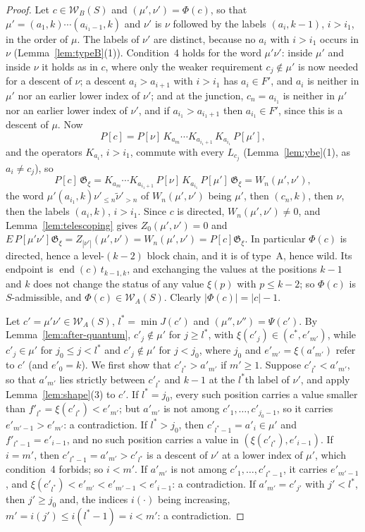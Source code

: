\documentclass[11pt]{article}
\newcommand{\G}{\mathfrak{G}}
\begin{document}
\begin{proof}
Let $c\in\mathcal W_B(S)$ and $(\mu',\nu')=\Phi(c)$, so that
$\mu'=(a_1,k)\cdots(a_{i_1-1},k)$ and $\nu'$ is $\nu$ followed by the
labels $(a_i,k-1)$, $i>i_1$, in the order of $\mu$. The labels of
$\nu'$ are distinct, because no $a_i$ with $i>i_1$ occurs in $\nu$
(Lemma~\ref{lem:typeB}(1)). Condition~4 holds for the word
$\mu'\nu'$: inside $\mu'$ and inside $\nu$ it holds as in $c$, where
only the weaker requirement $c_j\notin\mu'$ is now needed for a
descent of $\nu$; a descent $a_i>a_{i+1}$ with $i>i_1$ has
$a_i\in F'$, and $a_i$ is neither in $\mu'$ nor an earlier lower index
of $\nu'$; and at the junction, $c_n=a_{i_1}$ is neither in $\mu'$ nor
an earlier lower index of $\nu'$, and if $a_{i_1}>a_{i_1+1}$ then
$a_{i_1}\in F'$, since this is a descent of $\mu$. Now
\[
 P[c]=P[\nu]\,K_{a_m}\cdots K_{a_{i_1+1}}\,K_{a_{i_1}}\,P[\mu'],
\]
and the operators $K_{a_i}$, $i>i_1$, commute with every $L_{c_j}$
(Lemma~\ref{lem:ybe}(1), as $a_i\neq c_j$), so
\[
 P[c]\,\G_\xi=K_{a_m}\cdots K_{a_{i_1+1}}\,P[\nu]\,K_{a_{i_1}}\,P[\mu']\,\G_\xi
 =W_n(\mu',\nu') ,
\]
the word $\mu'(a_{i_1},k)\nu'_{\leq n}\tilde\nu'_{>n}$ of
$W_n(\mu',\nu')$ being $\mu'$, then $(c_n,k)$, then $\nu$, then the
labels $(a_i,k)$, $i>i_1$. Since $c$ is directed,
$W_n(\mu',\nu')\neq0$, and Lemma~\ref{lem:telescoping} gives
$Z_0(\mu',\nu')=0$ and
$E\,P[\mu'\nu']\G_\xi=Z_{|\nu'|}(\mu',\nu')=W_n(\mu',\nu')=P[c]\G_\xi$.
In particular $\Phi(c)$ is directed, hence a level-$(k-2)$ block
chain, and it is of type~A, hence wild. Its endpoint is
$\operatorname{end}(c)\,t_{k-1,k}$, and exchanging the values at the
positions $k-1$ and $k$ does not change the status of any value
$\xi(p)$ with $p\leq k-2$; so $\Phi(c)$ is $S$-admissible, and
$\Phi(c)\in\mathcal W_A(S)$. Clearly $|\Phi(c)|=|c|-1$.

Let $c'=\mu'\nu'\in\mathcal W_A(S)$, $l^\ast=\min J(c')$ and
$(\mu'',\nu'')=\Psi(c')$. By Lemma~\ref{lem:after-quantum},
$c'_j\notin\mu'$ for $j\geq l^\ast$, with
$\xi(c'_j)\in(c^\ast,e'_{m'})$, while $c'_j\in\mu'$ for
$j_0\leq j<l^\ast$ and $c'_j\notin\mu'$ for $j<j_0$, where $j_0$ and
$e'_{m'}=\xi(a'_{m'})$ refer to $c'$ (and $e'_0=k$). We first show that
$c'_{l^\ast}>a'_{m'}$ if $m'\geq1$. Suppose $c'_{l^\ast}<a'_{m'}$, so
that $a'_{m'}$ lies strictly between $c'_{l^\ast}$ and $k-1$ at the
$l^\ast$th label of $\nu'$, and apply Lemma~\ref{lem:shape}(3) to
$c'$. If $l^\ast=j_0$, every such position carries a value smaller than
$f'_{l^\ast}=\xi(c'_{l^\ast})<e'_{m'}$; but $a'_{m'}$ is not among
$c'_1,\ldots,c'_{j_0-1}$, so it carries $e'_{m'-1}>e'_{m'}$: a
contradiction. If $l^\ast>j_0$, then $c'_{l^\ast-1}=a'_i\in\mu'$ and
$f'_{l^\ast-1}=e'_{i-1}$, and no such position carries a value in
$(\xi(c'_{l^\ast}),e'_{i-1})$. If $i=m'$, then
$c'_{l^\ast-1}=a'_{m'}>c'_{l^\ast}$ is a descent of $\nu'$ at a lower
index of $\mu'$, which condition~4 forbids; so $i<m'$. If $a'_{m'}$ is
not among $c'_1,\ldots,c'_{l^\ast-1}$, it carries $e'_{m'-1}$, and
$\xi(c'_{l^\ast})<e'_{m'}<e'_{m'-1}<e'_{i-1}$: a contradiction. If
$a'_{m'}=c'_{j'}$ with $j'<l^\ast$, then $j'\geq j_0$ and, the indices
$i(\cdot)$ being increasing, $m'=i(j')\leq i(l^\ast-1)=i<m'$: a
contradiction.


\end{proof}
\end{document}
